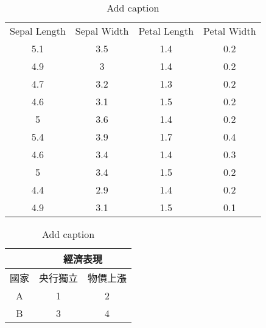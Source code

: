\begin{table}[htbp]
  \centering
  \caption{Add caption}
    \begin{tabular}{cccc}
    Sepal Length & Sepal Width & Petal Length & Petal Width \\
    5.1   & 3.5   & 1.4   & 0.2 \\
    4.9   & 3     & 1.4   & 0.2 \\
    4.7   & 3.2   & 1.3   & 0.2 \\
    4.6   & 3.1   & 1.5   & 0.2 \\
    5     & 3.6   & 1.4   & 0.2 \\
    5.4   & 3.9   & 1.7   & 0.4 \\
    4.6   & 3.4   & 1.4   & 0.3 \\
    5     & 3.4   & 1.5   & 0.2 \\
    4.4   & 2.9   & 1.4   & 0.2 \\
    4.9   & 3.1   & 1.5   & 0.1 \\
    \end{tabular}%
  \label{tab:addlabel}%
\end{table}%

\begin{table}[htbp]
  \centering
  \caption{Add caption}
    \begin{tabular}{ccc}
\cmidrule{2-3}    \multicolumn{1}{r}{} & \multicolumn{2}{c}{\cellcolor[rgb]{ 1,  1,  0}經濟表現} \\
    \midrule
    國家    & 央行獨立  & 物價上漲 \\
    \midrule
    A     & 1     & 2 \\
    \midrule
    B     & 3     & 4 \\
    \bottomrule
    \end{tabular}%
  \label{tab:addlabel}%
\end{table}%


